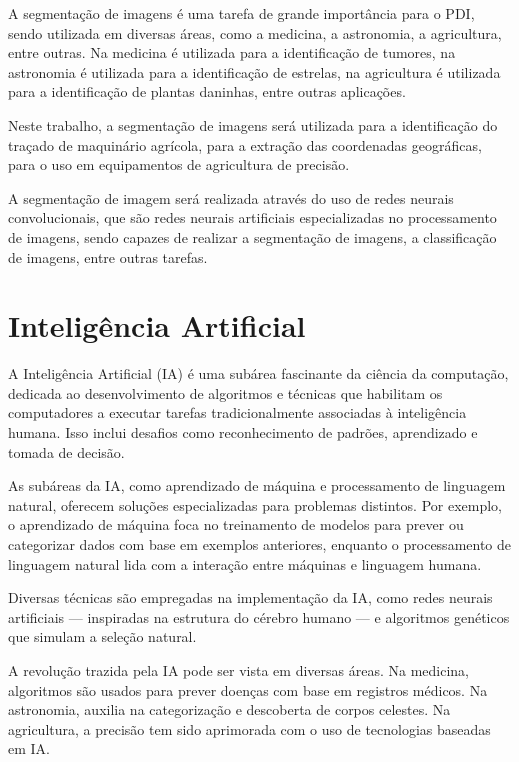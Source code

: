 \documentclass[conference]{IEEEtran}
\begin{document}
A segmentação de imagens é uma tarefa de grande importância para o PDI, sendo utilizada em diversas áreas, como a medicina,
a astronomia, a agricultura, entre outras. Na medicina é utilizada para a identificação de tumores, na astronomia é utilizada
para a identificação de estrelas, na agricultura é utilizada para a identificação de plantas daninhas, entre outras aplicações.

Neste trabalho, a segmentação de imagens será utilizada para a identificação do traçado de maquinário agrícola, para a
extração das coordenadas geográficas, para o uso em equipamentos de agricultura de precisão.

A segmentação de imagem será realizada através do uso de redes neurais convolucionais, que são redes neurais artificiais
especializadas no processamento de imagens, sendo capazes de realizar a segmentação de imagens, a classificação de imagens,
entre outras tarefas.

\section{Inteligência Artificial}
A Inteligência Artificial (IA) é uma subárea fascinante da ciência da computação,
dedicada ao desenvolvimento de algoritmos e técnicas que habilitam os computadores a
executar tarefas tradicionalmente associadas à inteligência humana.
Isso inclui desafios como reconhecimento de padrões, aprendizado e tomada de decisão.
\cite{lima2014inteligencia}

As subáreas da IA, como aprendizado de máquina e processamento de linguagem natural, 
oferecem soluções especializadas para problemas distintos. Por exemplo, o aprendizado
de máquina foca no treinamento de modelos para prever ou categorizar dados com base em
exemplos anteriores, enquanto o processamento de linguagem natural lida com a interação
entre máquinas e linguagem humana.
\cite{faceli2022inteligencia}

Diversas técnicas são empregadas na implementação da IA, como redes neurais artificiais
— inspiradas na estrutura do cérebro humano — e algoritmos genéticos que simulam a seleção natural.

A revolução trazida pela IA pode ser vista em diversas áreas. Na medicina, algoritmos são usados para
prever doenças com base em registros médicos. Na astronomia, auxilia na categorização e descoberta de
corpos celestes. Na agricultura, a precisão tem sido aprimorada com o uso de tecnologias baseadas em IA.
\cite{faceli2022inteligencia}
\end{document}
